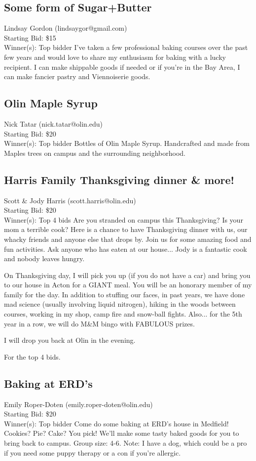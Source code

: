 \documentclass[11pt]{article}
\begin{document}
\subsection{Some form of Sugar+Butter}
Lindsay Gordon (lindsaygor@gmail.com) \\
Starting Bid: \$15 \\
Winner(s): 
Top bidder\newline
I've taken a few professional baking courses over the past few years and would love to share my enthusiasm for baking with a lucky recipient. I can make shippable goods if needed or if you're in the Bay Area, I can make fancier pastry and Viennoiserie goods.
\subsection{Olin Maple Syrup}
Nick Tatar (nick.tatar@olin.edu) \\
Starting Bid: \$20 \\
Winner(s): 
Top bidder Bottles of Olin Maple Syrup. Handcrafted and made from Maples trees on campus and the surrounding neighborhood.
\subsection{Harris Family Thanksgiving dinner \& more!}
Scott \& Jody Harris (scott.harris@olin.edu) \\
Starting Bid: \$20 \\
Winner(s): 
Top 4 bids\newline
Are you stranded on campus this Thanksgiving? Is your mom a terrible cook? Here is a chance to have Thanksgiving dinner with us, our whacky friends and anyone else that drops by. Join us for some amazing food and fun activities. Ask anyone who has eaten at our house... Jody is a fantastic cook and nobody leaves hungry.

On Thanksgiving day, I will pick you up (if you do not have a car) and bring you to our house in Acton for a GIANT meal. You will be an honorary member of my  family for the day. In addition to stuffing our faces, in past years, we have done mad science (usually involving liquid nitrogen), hiking in the woods between courses, working in my shop, camp fire and snow-ball fights. Also... for the 5th year in a row, we will do M\&M bingo with FABULOUS prizes. 

I will drop you back at Olin in the evening.

For the top 4 bids.
\subsection{Baking at ERD's}
Emily Roper-Doten (emily.roper-doten@olin.edu) \\
Starting Bid: \$20 \\
Winner(s): 
Top bidder\newline
Come do some baking at ERD's house in Medfield! Cookies? Pie? Cake? You pick! We'll make some tasty baked goods for you to bring back to campus. Group size: 4-6. Note: I have a dog, which could be a pro if you need some puppy therapy or a con if you're allergic.
\end{document}
